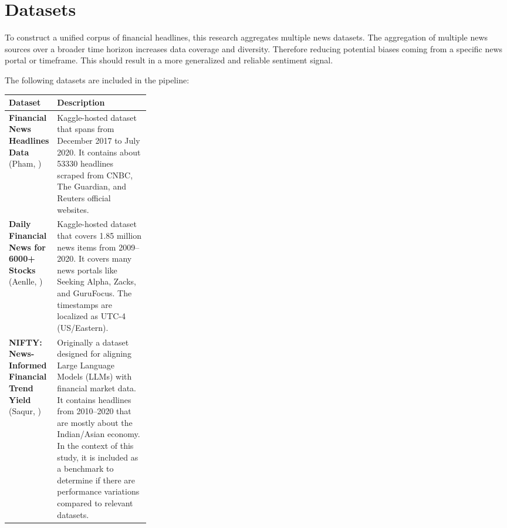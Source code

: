 \documentclass[Master,english,IEEE]{twbook}
\begin{document}
\section{Datasets}
To construct a unified corpus of financial headlines, this research aggregates multiple news datasets. The aggregation of multiple news sources over a broader time horizon increases data coverage and diversity. Therefore reducing potential biases coming from a specific news portal or timeframe. This should result in a more generalized and reliable sentiment signal. 

The following datasets are included in the pipeline:

\par\vspace{2ex}
\begin{minipage}{\linewidth}
    \centering
    \small
    \begin{tabularx}{\linewidth}{|p{0.28\linewidth}|X|}
    \hline
    \textbf{Dataset} & \textbf{Description} \\ \hline
    \textbf{Financial News Headlines Data} (Pham, \cite{pham_financial_news}) & Kaggle-hosted dataset that spans from December 2017 to July 2020. It contains about 53330 headlines scraped from CNBC, The Guardian, and Reuters official websites. \\ \hline
    \textbf{Daily Financial News for 6000+ Stocks} (Aenlle, \cite{aenlle_financial_news}) &Kaggle-hosted dataset that covers 1.85 million news items from 2009--2020. It covers many news portals like Seeking Alpha, Zacks, and GuruFocus. The timestamps are localized as UTC-4 (US/Eastern). \\ \hline
    \textbf{NIFTY: News-Informed Financial Trend Yield} (Saqur, \cite{raeidsaqur2024NiftyLM}) & Originally a dataset designed for aligning Large Language Models (LLMs) with financial market data. It contains headlines from 2010--2020 that are mostly about the Indian/Asian economy. In the context of this study, it is included as a benchmark to determine if there are performance variations compared to relevant datasets. \\ \hline
    \end{tabularx}
    \label{tab:integrated_datasets}
\end{minipage}
\par\vspace{1ex}
\end{document}
